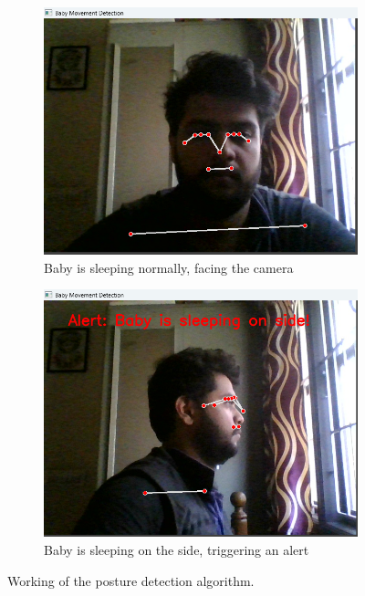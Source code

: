 \documentclass[12pt,a4paper]{report}
\begin{document}
\begin{figure}[htbp]
  \centering
  \begin{subfigure}[b]{0.3\textwidth}
    \centering
    \includegraphics[width=\textwidth]{./pic/posture-normal.png}
    \caption{Baby is sleeping normally, facing the camera}
    \label{fig:posture-normal}
\end{subfigure}
  \hspace{0.1\textwidth}
  \begin{subfigure}[b]{0.3\textwidth} %
      \centering
      \includegraphics[width=\textwidth]{./pic/posture-side.png}
      \caption{Baby is sleeping on the side, triggering an alert}
      \label{fig:posture-side}
  \end{subfigure}
  
  
  \caption{Working of the posture detection algorithm.}
    \label{fig:posture}
\end{figure}
\end{document}
